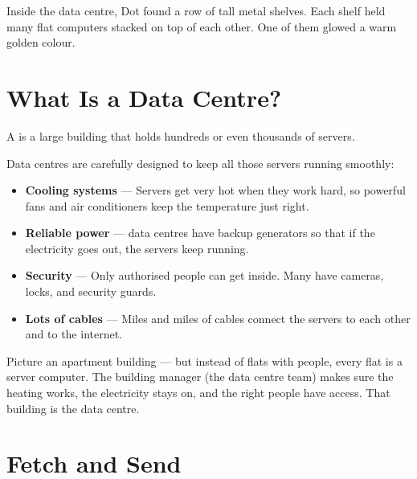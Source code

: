 Inside the data centre, Dot found a row of tall metal shelves.
Each shelf held many flat computers stacked on top of each other.
One of them glowed a warm golden colour.


\sectionrule

\section*{What Is a Data Centre?}

A  is a large building that holds hundreds or even thousands of servers.

Data centres are carefully designed to keep all those servers running smoothly:

\begin{itemize}
  \item \textbf{Cooling systems} — Servers get very hot when they work hard, so powerful fans and air conditioners keep the temperature just right.
  \item \textbf{Reliable power} — data centres have backup generators so that if the electricity goes out, the servers keep running.
  \item \textbf{Security} — Only authorised people can get inside. Many have cameras, locks, and security guards.
  \item \textbf{Lots of cables} — Miles and miles of cables connect the servers to each other and to the internet.
\end{itemize}

\begin{picturethis}
  Picture an apartment building — but instead of flats with people,
  every flat is a server computer.
  The building manager (the data centre team) makes sure the heating works,
  the electricity stays on, and the right people have access.
  That building is the data centre.
\end{picturethis}

\sectionrule

\section*{Fetch and Send}


